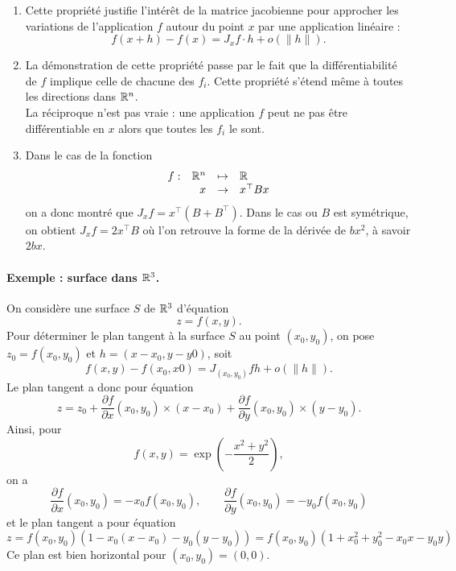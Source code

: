 \remark
\begin{enumerate}
  \item Cette propriété justifie l'intérêt de la matrice jacobienne pour approcher les variations de l'application $f$ autour du point $x$ par une application linéaire : 
  $$
  f(x+h) - f(x) = J_xf \cdot h + o(\|h\|).
  $$
  \item La démonstration de cette propriété passe par le fait que la différentiabilité de $f$ implique celle de chacune des $f_i$. Cette propriété s'étend même à toutes les directions dans $\mathbb{R}^n$. \\
  La réciproque n'est pas vraie : une application $f$ peut ne pas être différentiable en $x$ alors que toutes les $f_i$ le sont.
  \item Dans le cas de la fonction
  $$
  \begin{array}{rrcl}
    f : & \mathbb{R}^n & \mapsto & \mathbb{R} \\
    & x & \rightarrow & x^\top B x
  \end{array}
  $$
  on a donc montré que $J_x f = x^\top (B + B^\top)$. Dans le cas ou $B$ est symétrique, on obtient $J_x f = 2 x^\top B$ où l'on retrouve la forme de la dérivée de $bx^2$, à savoir $2 bx$.

\end{enumerate}

\paragraph{Exemple : surface dans $\mathbb{R}^3$.}
On considère une surface $S$ de $\mathbb{R}^3$ d'équation
$$
z = f(x, y).
$$
Pour déterminer le plan tangent à la surface $S$ au point $(x_0, y_0)$, on pose $z_0 = f(x_0, y_0)$ et $h = (x-x_0, y-y0)$, soit 
$$
f(x, y) - f(x_0, x0) = J_{(x_0, y_0)} f h + o(\|h\|).
$$
Le plan tangent a donc pour équation
$$
z = z_0 + \frac{\partial f}{\partial x}(x_0, y_0) \times (x-x_0) + \frac{\partial f}{\partial y}(x_0, y_0) \times (y-y_0).
$$
Ainsi, pour
$$
f(x, y) = \exp\left(-\frac{x^2 + y^2}{2}\right),
$$
on a 
$$
\frac{\partial f}{\partial x}(x_0, y_0) = - x_0 f(x_0, y_0), 
\qquad
\frac{\partial f}{\partial y}(x_0, y_0) = - y_0 f(x_0, y_0)
$$
et le plan tangent a pour équation
$$
z 
= f(x_0, y_0)(1 - x_0 (x-x_0) - y_0 (y-y_0))
= f(x_0, y_0)(1 + x_0^2 + y_0^2 - x_0 x - y_0 y)
$$
Ce plan est bien horizontal pour $(x_0, y_0) = (0, 0)$.


